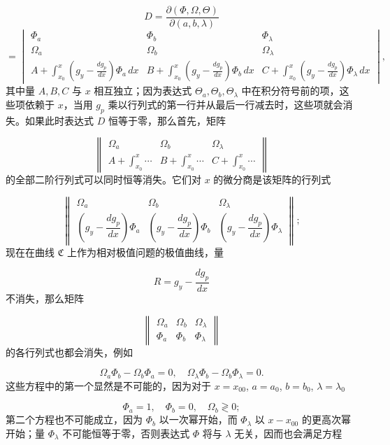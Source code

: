 \documentclass[11pt,a4paper,leqno]{article}
\begin{document}
\[
D=\frac{\partial(\Phi,\Omega,\Theta)}{\partial(a,b,\lambda)}
\]
\[
=\begin{vmatrix}
\Phi_a&\Phi_b&\Phi_\lambda\\[.6ex]
\Omega_a&\Omega_b&\Omega_\lambda\\[.6ex]
A+\displaystyle\int_{x_0}^{x}\left(g_y-\frac{dg_p}{dx}\right)\Phi_a\,dx&B+\displaystyle\int_{x_0}^{x}\left(g_y-\frac{dg_p}{dx}\right)\Phi_b\,dx&C+\displaystyle\int_{x_0}^{x}\left(g_y-\frac{dg_p}{dx}\right)\Phi_\lambda\,dx
\end{vmatrix},
\]
其中量 $A,B,C$ 与 $x$ 相互独立；因为表达式 $\Theta_a,\Theta_b,\Theta_\lambda$ 中在积分符号前的项，这些项依赖于 $x$，当用 $g_p$ 乘以行列式的第一行并从最后一行减去时，这些项就会消失。如果此时表达式 $D$ 恒等于零，那么首先，矩阵

\begin{equation}\tag{53}
\left\|\begin{array}{ccc}
\Omega_a&\Omega_b&\Omega_\lambda\\[.8ex]
A+\displaystyle\int_{x_0}^{x}\cdots&B+\displaystyle\int_{x_0}^{x}\cdots&C+\displaystyle\int_{x_0}^{x}\cdots
\end{array}\right\|
\end{equation}
的全部二阶行列式可以同时恒等消失。它们对 $x$ 的微分商是该矩阵的行列式

\[
\left\|\begin{array}{ccc}
\Omega_a&\Omega_b&\Omega_\lambda\\[.8ex]
\left(g_y-\dfrac{dg_p}{dx}\right)\Phi_a&
\left(g_y-\dfrac{dg_p}{dx}\right)\Phi_b&
\left(g_y-\dfrac{dg_p}{dx}\right)\Phi_\lambda
\end{array}\right\|;
\]
现在在曲线 $\mathfrak{C}$ 上作为相对极值问题的极值曲线，量

\[
R=g_y-\frac{dg_p}{dx}
\]
不消失，那么矩阵

\[
\left\|\begin{array}{ccc}
\Omega_a&\Omega_b&\Omega_\lambda\\
\Phi_a&\Phi_b&\Phi_\lambda
\end{array}\right\|
\]
的各行列式也都会消失，例如

\begin{equation}\tag{54}
\Omega_a\Phi_b-\Omega_b\Phi_a=0,
\quad
\Omega_\lambda\Phi_b-\Omega_b\Phi_\lambda=0.
\end{equation}
这些方程中的第一个显然是不可能的，因为对于 $x=x_{00}$, $a=a_0$, $b=b_0$, $\lambda=\lambda_0$

\begin{equation}\tag{55}
\Phi_a=1,
\quad \Phi_b=0,
\quad \Omega_b\gtrless 0;
\end{equation}
第二个方程也不可能成立，因为 $\Phi_b$ 以一次幂开始，而 $\Phi_\lambda$ 以 $x-x_{00}$ 的更高次幂开始；量 $\Phi_\lambda$ 不可能恒等于零，否则表达式 $\Phi$ 将与 $\lambda$ 无关，因而也会满足方程
\end{document}
